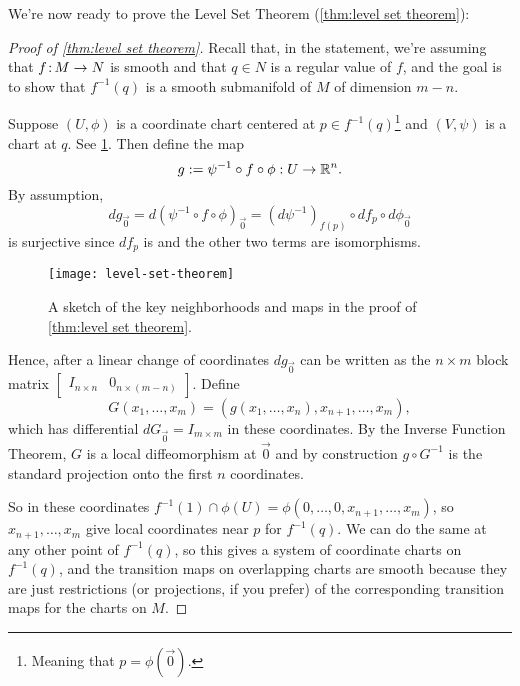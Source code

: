 We're now ready to prove the Level Set Theorem (\cref{thm:level set theorem}):

\begin{proof}[Proof of \cref{thm:level set theorem}]
	Recall that, in the statement, we're assuming that $f\colon\thinspace\!\! M \to N$ is smooth and that $q \in N$ is a regular value of $f$, and the goal is to show that $f^{-1}(q)$ is a smooth submanifold of $M$ of dimension $m-n$.
	
	Suppose $(U,\phi)$ is a coordinate chart centered at $p \in f^{-1}(q)$\footnote{Meaning that $p = \phi(\vec{0})$.} and $(V, \psi)$ is a chart at $q$. See \cref{fig:level set theorem}. Then define the map
	\[
		g := \psi^{-1} \circ f \circ \phi: U \to \mathbb{R}^n.
	\]
	By assumption,
	\[
		dg_{\vec{0}} = d(\psi^{-1} \circ f \circ \phi)_{\vec{0}} = (d \psi^{-1})_{f(p)} \circ df_p \circ d\phi_{\vec{0}}
	\]
	is surjective since $df_p$ is and the other two terms are isomorphisms.
	
	\begin{figure}[htbp]
		\centering
			\texttt{[image: level-set-theorem]}
		\caption{A sketch of the key neighborhoods and maps in the proof of \cref{thm:level set theorem}.}
		\label{fig:level set theorem}
	\end{figure}
	
	Hence, after a linear change of coordinates $dg_{\vec{0}}$ can be written as the $n \times m$ block matrix $\begin{bmatrix} I_{n \times n} & 0_{n \times (m-n)} \end{bmatrix}$. Define
	\[
		G(x_1, \dots , x_m) = (g(x_1, \dots , x_n), x_{n+1}, \dots , x_m),
	\]
	which has differential $dG_{\vec{0}} = I_{m \times m}$ in these coordinates. By the Inverse Function Theorem, $G$ is a local diffeomorphism at $\vec{0}$ and by construction $g \circ G^{-1}$ is the standard projection onto the first $n$ coordinates.
	
	So in these coordinates $f^{-1}(1) \cap \phi(U) = \phi(0, \dots , 0, x_{n+1}, \dots , x_m)$, so $x_{n+1} , \dots , x_m$ give local coordinates near $p$ for $f^{-1}(q)$. We can do the same at any other point of $f^{-1}(q)$, so this gives a system of coordinate charts on $f^{-1}(q)$, and the transition maps on overlapping charts are smooth because they are just restrictions (or projections, if you prefer) of the corresponding transition maps for the charts on $M$.
\end{proof}